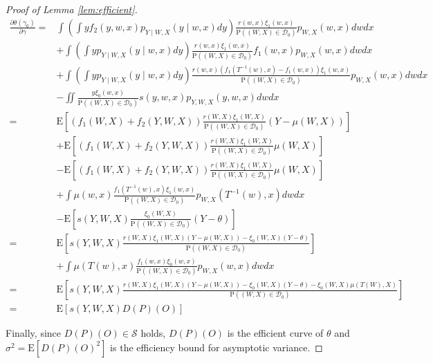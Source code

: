 \documentclass[11pt]{article}
\def\P{{\mathrm P}}
\def\E{{\mathrm E}}
\numberwithin{equation}{section}
\theoremstyle{definition}
\begin{document}
\begin{proof}[Proof of Lemma \ref{lem:efficient}]
\begin{align*}
\frac{\partial \theta\left(\gamma_{0}\right)}{\partial \gamma}= & \int\left(\int yf_2(y,w,x)p_{Y\mid W,X}(y\mid w,x)dy\right)\frac{r(w,x)\xi_1(w,x)}{\P((W,X)\in\mathcal{D}_0)}p_{W,X}(w,x)dwdx\\
&+\int\left(\int yp_{Y\mid W,X}(y\mid w,x)dy\right)\frac{r(w,x)\xi_1(w,x)}{\P((W,X)\in\mathcal{D}_0)}f_1(w,x)p_{W,X}(w,x)dwdx\\
&+\int\left(\int yp_{Y\mid W,X}(y\mid w,x)dy\right)\frac{r(w,x)(f_1(T^{-1}(w),x)-f_1(w,x))\xi_1(w,x)}{\P((W,X)\in\mathcal{D}_0)}p_{W,X}(w,x)dwdx\\
&-\iint\frac{y\xi_0(w,x)}{\P((W,X)\in\mathcal{D}_0)} s(y,w,x)p_{Y,W,X}(y,w,x) dwdx\\
=&\E[(f_1(W,X)+f_2(Y,W,X))\frac{r(W,X)\xi_1(W,X)}{\P((W,X)\in\mathcal{D}_0)}(Y-\mu(W,X))]\\
&+\E[(f_1(W,X)+f_2(Y,W,X))\frac{r(W,X)\xi_1(W,X)}{\P((W,X)\in\mathcal{D}_0)}\mu(W,X)]\\
&-\E[(f_1(W,X)+f_2(Y,W,X))\frac{r(W,X)\xi_1(W,X)}{\P((W,X)\in\mathcal{D}_0)}\mu(W,X)]\\
&+\int\mu(w,x)\frac{f_1(T^{-1}(w),x)\xi_1(w,x)}{\P((W,X)\in\mathcal{D}_0)}p_{W,X}(T^{-1}(w),x)dwdx\\
&-\E[s(Y,W,X)\frac{\xi_0(W,X)}{\P((W,X)\in\mathcal{D}_0)}(Y-\theta)]\\
=&\E\left[s(Y,W,X)\frac{r(W,X)\xi_1(W,X)(Y-\mu(W,X))-\xi_0(W,X)(Y-\theta)}{\P((W,X)\in\mathcal{D}_0)}\right]\\
&+\int\mu(T(w),x)\frac{f_1(w,x)\xi_0(w,x)}{\P((W,X)\in\mathcal{D}_0)}p_{W,X}(w,x)dwdx\\
=&\E\left[s(Y,W,X)\frac{r(W,X)\xi_1(W,X)(Y-\mu(W,X))-\xi_0(W,X)(Y-\theta)-\xi_0(W,X)\mu(T(W),X)}{\P((W,X)\in\mathcal{D}_0)}\right]\\
=&\E\left[s(Y,W,X)D(P)(O)\right]
\end{align*}

Finally, since $D(P)(O)\in\mathscr{S}$ holds, $D(P)(O)$ is the efficient curve of $\theta$ and $\sigma^2=\E[D(P)(O)^2]$ is the efficiency bound for asymptotic variance.
\end{proof}
\end{document}
